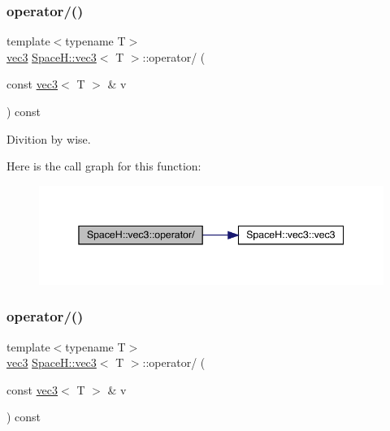 \subsubsection{\texorpdfstring{operator/()}{operator/()}\hspace{0.1cm}{\footnotesize\ttfamily [3/7]}}
{\footnotesize\ttfamily template$<$typename T$>$ \\
\mbox{\hyperlink{struct_space_h_1_1vec3}{vec3}} \mbox{\hyperlink{struct_space_h_1_1vec3}{Space\+H\+::vec3}}$<$ T $>$\+::operator/ (\begin{DoxyParamCaption}\item[{const \mbox{\hyperlink{struct_space_h_1_1vec3}{vec3}}$<$ T $>$ \&}]{v }\end{DoxyParamCaption}) const\hspace{0.3cm}{\ttfamily [inline]}}



Divition by wise. 

Here is the call graph for this function\+:
\nopagebreak
\begin{figure}[H]
\begin{center}
\leavevmode
\includegraphics[width=345pt]{struct_space_h_1_1vec3_ab9d46a10bb578ff6939ed9280cb12df8_cgraph}
\end{center}
\end{figure}
\mbox{\label{struct_space_h_1_1vec3_ab9d46a10bb578ff6939ed9280cb12df8}} 
\subsubsection{\texorpdfstring{operator/()}{operator/()}\hspace{0.1cm}{\footnotesize\ttfamily [4/7]}}
{\footnotesize\ttfamily template$<$typename T$>$ \\
\mbox{\hyperlink{struct_space_h_1_1vec3}{vec3}} \mbox{\hyperlink{struct_space_h_1_1vec3}{Space\+H\+::vec3}}$<$ T $>$\+::operator/ (\begin{DoxyParamCaption}\item[{const \mbox{\hyperlink{struct_space_h_1_1vec3}{vec3}}$<$ T $>$ \&}]{v }\end{DoxyParamCaption}) const\hspace{0.3cm}{\ttfamily [inline]}}



